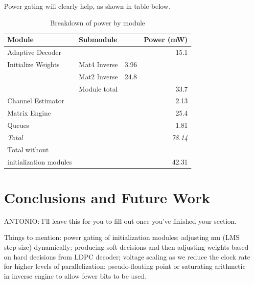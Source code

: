 \documentclass[journal]{IEEEtran}
\begin{document}
Power gating will clearly help, as shown in table below.

\begin{table}[!h]
\caption{Breakdown of power by module}
\label{power_breakdown_table}
\centering
\begin{tabular}{l l l r}
\hline
Module & Submodule & & Power (mW) \\
\hline
Adaptive Decoder & & & 15.1 \\
Initialize Weights & Mat4 Inverse & 3.96 & \\
 & Mat2 Inverse & 24.8 & \\
 & Module total & & 33.7 \\
Channel Estimator & & & 2.13 \\
Matrix Engine & & & 25.4 \\
Queues & & & 1.81 \\
\hline
\em{Total} & & & \em{78.14} \\
Total without & & & \\
initialization modules & & & 42.31 \\
\hline
\end{tabular}
\end{table}


\section{Conclusions and Future Work}

ANTONIO: I'll leave this for you to fill out once you've finished your section.

Things to mention: power gating of initialization modules; adjusting mu (LMS step size) dynamically; producing soft decisions and then adjusting weights based on hard decisions from LDPC decoder; voltage scaling as we reduce the clock rate for higher levels of parallelization; pseudo-floating point or saturating arithmetic in inverse engine to allow fewer bits to be used.


\ifCLASSOPTIONcaptionsoff
  \newpage
\fi





\end{document}
